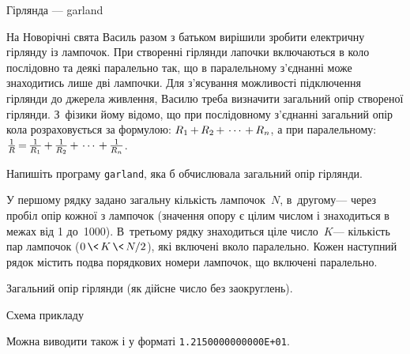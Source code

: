 \documentclass[14pt,a4paper]{extarticle}
\def\dib#1{\,#1\discretionary{}{\mbox{$#1$}}{}\,}
\begin{document}
\vspace{-0.5\baselineskip minus 1cm}
\begin{problemAllDefault}{Гірлянда --- garland}


На Новорічні свята Василь разом з батьком вирішили зробити електричну гірлянду із лампочок. При створенні гірлянди лапочки включаються в коло послідовно та деякі паралельно так, що в паралельному з’єднанні може знаходитись лише дві лампочки. Для з’ясування можливості підключення гірлянди до джерела живлення, Василю треба визначити загальний опір створеної гірлянди. З~фізики йому відомо, що при послідовному з’єднанні загальний опір кола розраховується за формулою: $R_1\dib{{+}}R_2\dib{{+}}\cdots\dib{{+}}R_n$, а при паралельному: $\frac{1}{R} \dib{{=}} \frac{1}{R_1} \dib{{+}} \frac{1}{R_2} \dib{{+}} \cdots \dib{{+}} \frac{1}{R_n}$.

Напишіть програму \texttt{garland}, яка б обчислювала загальний опір гірлянди.

\InputFile У першому рядку задано загальну кількість лампочок~$N$, в~другому\nolinebreak[3] --- через пробіл опір кожної з лампочок (значення опору є цілим числом і знаходиться в межах від 1 до~1000). В~третьому рядку знаходиться ціле число~$K$\nolinebreak[3] --- кількість пар лампочок ($0\dib{{\<}}K\dib{{\<}}{N/2}$), які включені в\nolinebreak[3] коло паралельно. Кожен наступний рядок містить по\nolinebreak[2] два порядкових номери лампочок, що включені паралельно.

\OutputFile Загальний опір гірлянди (як дійсне число без заокруглень).

\Example

\vspace{-\baselineskip}

\begin{exampleSimpleThree}{6em}{3em}{14.5em}{Схема прикладу}
%
\end{exampleSimpleThree}


\Note %
Можна виводити також і у форматі \texttt{1.2150000000000E+01}.

\end{problemAllDefault}
	
\end{document}
